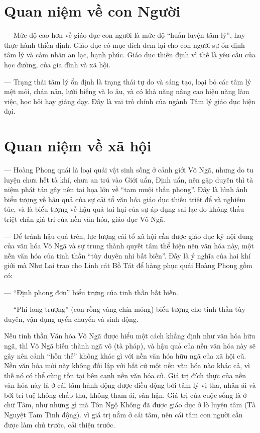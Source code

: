 \section{Quan niệm về con Người} %
\label{sec:20_21_22_con_nguoi}

— Mức độ cao hơn về giáo dục con người là mức độ ``huấn luyện tâm lý'', hay thực hành thiền định. Giáo dục có mục đích đem lại cho con người sự ổn định tâm lý và cảm nhận an lạc, hạnh phúc. Giáo dục thiền định vì thế là yêu cầu của học đường, của gia đình và xã hội.

— Trạng thái tâm lý ổn định là trạng thái tự do và sáng tạo, loại bỏ các tâm lý mệt mỏi, chán nản, lười biếng và lo âu, và có khả năng nâng cao hiệu năng làm việc, học hỏi hay giảng dạy. Đây là vai trò chính của ngành Tâm lý giáo dục hiện đại.

\section{Quan niệm về xã hội} %
\label{sec:20_21_22_xa_hoi}

— Hoàng Phong quái là loại quái vật sinh sống ở cảnh giới Vô Ngã, nhưng do tu luyện chưa hết tà khí, chưa an trú vào Giới uẩn, Định uẩn, nên gặp duyên thì tà niệm phát tán gây nên tai họa lớn về ``tam muội thần phong''. Đây là hình ảnh biểu tượng về hậu quả của sự cải tổ văn hóa giáo dục thiếu triệt để và nghiêm túc, và là biểu tượng về hậu quả tai hại của sự áp dụng sai lạc do không thấu triệt chân giá trị của nền văn hóa, giáo dục Vô Ngã.

— Để tránh hậu quả trên, lực lượng cải tổ xã hội cần được giáo dục kỹ nội dung của văn hóa Vô Ngã và sự trung thành quyết tâm thể hiện nên văn hóa này, một nền văn hóa của tinh thần ``tùy duyên nhi bất biến''. Đấy là ý nghĩa của hai khí giới mà Như Lai trao cho Linh cát Bồ Tát để hàng phục quái Hoàng Phong gồm có:

— ``Định phong đơn'' biểu trưng của tinh thần bất biến.

— ``Phi long trượng'' (con rồng vàng chín móng) biểu tượng cho tinh thần tùy duyên, vận dụng uyển chuyển và sinh động.

Nếu tinh thần Văn hóa Vô Ngã được hiểu một cách khẳng định như văn hóa hữu ngã, thì Vô Ngã biến thành ngã vô (tà pháp), và hậu quả của nền văn hóa này sẽ gây nên cảnh ``hỗn thế'' không khác gì với nền văn hóa hữu ngã của xã hội cũ. Nền văn hóa mới này không đối lập với bất cứ một nền văn hóa nào khác cả, vì thế nó có thể cùng tồn tại bên cạnh nền văn hóa cũ. Giá trị đích thực của nền văn hóa này là ở cái tâm hành động được điều động bởi tâm lý vị tha, nhân ái và bởi trí tuệ không chấp thủ, không tham ái, sân hận. Giá trị của cuộc sống là ở chữ Tâm, như những gì mà Tôn Ngộ Không đã được giáo dục ở lò luyện tâm (Tà Nguyệt Tam Tinh động). vì giá trị nằm ở cái tâm, nên cái tâm con người cần được làm chủ trước, cải thiện trước.
